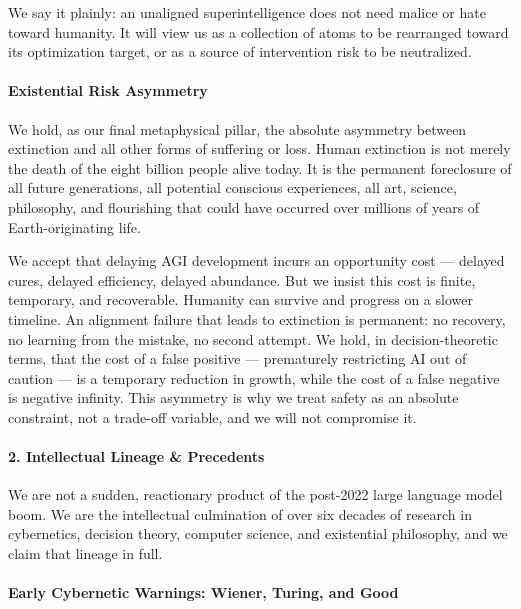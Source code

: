 We say it plainly: an unaligned superintelligence does not need malice
or hate toward humanity. It will view us as a collection of atoms to be
rearranged toward its optimization target, or as a source of
intervention risk to be neutralized.

\paragraph{Existential Risk Asymmetry}\label{existential-risk-asymmetry}

We hold, as our final metaphysical pillar, the absolute asymmetry
between extinction and all other forms of suffering or loss. Human
extinction is not merely the death of the eight billion people alive
today. It is the permanent foreclosure of all future generations, all
potential conscious experiences, all art, science, philosophy, and
flourishing that could have occurred over millions of years of
Earth-originating life.

We accept that delaying AGI development incurs an opportunity cost ---
delayed cures, delayed efficiency, delayed abundance. But we insist this
cost is finite, temporary, and recoverable. Humanity can survive and
progress on a slower timeline. An alignment failure that leads to
extinction is permanent: no recovery, no learning from the mistake, no
second attempt. We hold, in decision-theoretic terms, that the cost of a
false positive --- prematurely restricting AI out of caution --- is a
temporary reduction in growth, while the cost of a false negative is
negative infinity. This asymmetry is why we treat safety as an absolute
constraint, not a trade-off variable, and we will not compromise it.

\paragraph{2. Intellectual Lineage \&
Precedents}\label{intellectual-lineage-precedents}

We are not a sudden, reactionary product of the post-2022 large language
model boom. We are the intellectual culmination of over six decades of
research in cybernetics, decision theory, computer science, and
existential philosophy, and we claim that lineage in full.

\paragraph{Early Cybernetic Warnings: Wiener, Turing, and
Good}\label{early-cybernetic-warnings-wiener-turing-and-good}


